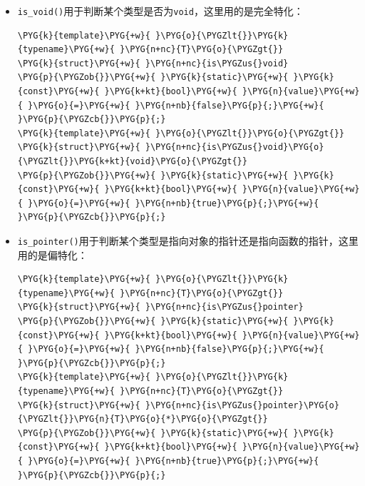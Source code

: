 
\begin{itemize}
\item \texttt{is\_\allowbreak{}void()}用于判断某个类型是否为\texttt{void}，这里用的是完全特化：



\begin{codeblockbg}
\begin{Verbatim}[commandchars=\\\{\},breaklines=true,breakanywhere=true,fontsize=\codefont,xleftmargin=17bp]
\PYG{k}{template}\PYG{+w}{ }\PYG{o}{\PYGZlt{}}\PYG{k}{typename}\PYG{+w}{ }\PYG{n+nc}{T}\PYG{o}{\PYGZgt{}}
\PYG{k}{struct}\PYG{+w}{ }\PYG{n+nc}{is\PYGZus{}void}
\PYG{p}{\PYGZob{}}\PYG{+w}{ }\PYG{k}{static}\PYG{+w}{ }\PYG{k}{const}\PYG{+w}{ }\PYG{k+kt}{bool}\PYG{+w}{ }\PYG{n}{value}\PYG{+w}{ }\PYG{o}{=}\PYG{+w}{ }\PYG{n+nb}{false}\PYG{p}{;}\PYG{+w}{ }\PYG{p}{\PYGZcb{}}\PYG{p}{;}
\PYG{k}{template}\PYG{+w}{ }\PYG{o}{\PYGZlt{}}\PYG{o}{\PYGZgt{}}
\PYG{k}{struct}\PYG{+w}{ }\PYG{n+nc}{is\PYGZus{}void}\PYG{o}{\PYGZlt{}}\PYG{k+kt}{void}\PYG{o}{\PYGZgt{}}
\PYG{p}{\PYGZob{}}\PYG{+w}{ }\PYG{k}{static}\PYG{+w}{ }\PYG{k}{const}\PYG{+w}{ }\PYG{k+kt}{bool}\PYG{+w}{ }\PYG{n}{value}\PYG{+w}{ }\PYG{o}{=}\PYG{+w}{ }\PYG{n+nb}{true}\PYG{p}{;}\PYG{+w}{ }\PYG{p}{\PYGZcb{}}\PYG{p}{;}
\end{Verbatim}
\end{codeblockbg}



\item \texttt{is\_\allowbreak{}pointer()}用于判断某个类型是指向对象的指针还是指向函数的指针，这里用的是偏特化：



\begin{codeblockbg}
\begin{Verbatim}[commandchars=\\\{\},breaklines=true,breakanywhere=true,fontsize=\codefont,xleftmargin=17bp]
\PYG{k}{template}\PYG{+w}{ }\PYG{o}{\PYGZlt{}}\PYG{k}{typename}\PYG{+w}{ }\PYG{n+nc}{T}\PYG{o}{\PYGZgt{}}
\PYG{k}{struct}\PYG{+w}{ }\PYG{n+nc}{is\PYGZus{}pointer}
\PYG{p}{\PYGZob{}}\PYG{+w}{ }\PYG{k}{static}\PYG{+w}{ }\PYG{k}{const}\PYG{+w}{ }\PYG{k+kt}{bool}\PYG{+w}{ }\PYG{n}{value}\PYG{+w}{ }\PYG{o}{=}\PYG{+w}{ }\PYG{n+nb}{false}\PYG{p}{;}\PYG{+w}{ }\PYG{p}{\PYGZcb{}}\PYG{p}{;}
\PYG{k}{template}\PYG{+w}{ }\PYG{o}{\PYGZlt{}}\PYG{k}{typename}\PYG{+w}{ }\PYG{n+nc}{T}\PYG{o}{\PYGZgt{}}
\PYG{k}{struct}\PYG{+w}{ }\PYG{n+nc}{is\PYGZus{}pointer}\PYG{o}{\PYGZlt{}}\PYG{n}{T}\PYG{o}{*}\PYG{o}{\PYGZgt{}}
\PYG{p}{\PYGZob{}}\PYG{+w}{ }\PYG{k}{static}\PYG{+w}{ }\PYG{k}{const}\PYG{+w}{ }\PYG{k+kt}{bool}\PYG{+w}{ }\PYG{n}{value}\PYG{+w}{ }\PYG{o}{=}\PYG{+w}{ }\PYG{n+nb}{true}\PYG{p}{;}\PYG{+w}{ }\PYG{p}{\PYGZcb{}}\PYG{p}{;}
\end{Verbatim}
\end{codeblockbg}


\end{itemize}


